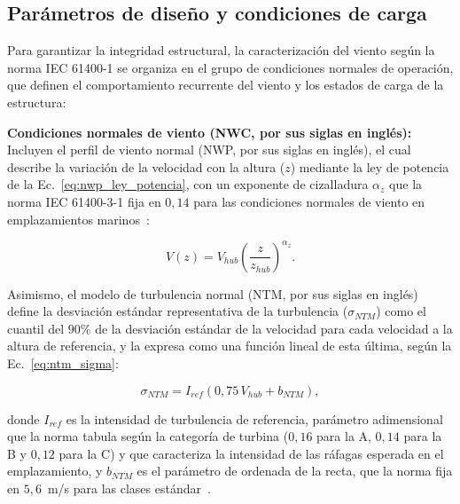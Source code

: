 \subsection{Parámetros de diseño y condiciones de carga}
\label{sec:condiciones_diseno}

Para garantizar la integridad estructural, la caracterización del viento según la norma IEC 61400-1 se organiza en el grupo de condiciones normales de operación, que definen el comportamiento recurrente del viento y los estados de carga de la estructura:

\textbf{Condiciones normales de viento (NWC, por sus siglas en inglés):} Incluyen el perfil de viento normal (NWP, por sus siglas en inglés), el cual describe la variación de la velocidad con la altura ($z$) mediante la ley de potencia de la Ec.~\ref{eq:nwp_ley_potencia}, con un exponente de cizalladura $\alpha_z$ que la norma IEC 61400-3-1 fija en $0{,}14$ para las condiciones normales de viento en emplazamientos marinos~\parencite*{IEC61400-3-1}:

\begin{equation}
    V(z) = V_{hub} \left(\frac{z}{z_{hub}}\right)^{\alpha_z}.
    \label{eq:nwp_ley_potencia}
\end{equation}

Asimismo, el modelo de turbulencia normal (NTM, por sus siglas en inglés) define la desviación estándar representativa de la turbulencia ($\sigma_{NTM}$) como el cuantil del $90\%$ de la desviación estándar de la velocidad para cada velocidad a la altura de referencia, y la expresa como una función lineal de esta última, según la Ec.~\ref{eq:ntm_sigma}:

\begin{equation}
    \sigma_{NTM} = I_{ref} \left(0{,}75 \, V_{hub} + b_{NTM}\right),
    \label{eq:ntm_sigma}
\end{equation}

donde $I_{ref}$ es la intensidad de turbulencia de referencia, parámetro adimensional que la norma tabula según la categoría de turbina ($0{,}16$ para la A, $0{,}14$ para la B y $0{,}12$ para la C) y que caracteriza la intensidad de las ráfagas esperada en el emplazamiento, y $b_{NTM}$ es el parámetro de ordenada de la recta, que la norma fija en $5{,}6$~m/s para las clases estándar~\parencite{IEC61400-1}.

